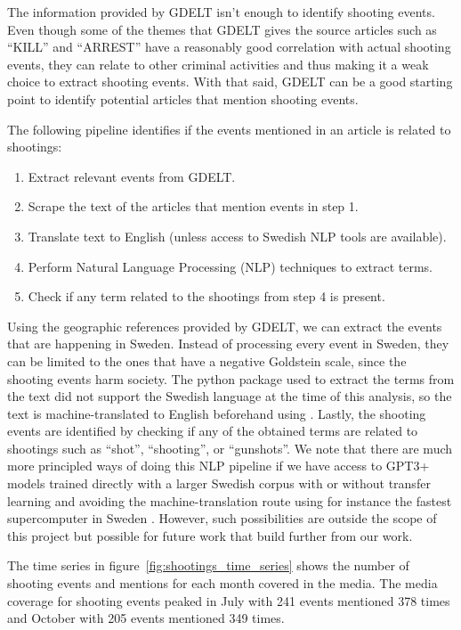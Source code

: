 \documentclass[a4, 11pt]{article}
\begin{document}
 The information provided by GDELT isn't enough to identify shooting
 events. Even though some of the themes that GDELT gives the source articles such as ``KILL''
 and ``ARREST'' have a reasonably good correlation with actual shooting events, they can relate
 to other criminal activities and thus making it a weak choice to extract shooting events. 
 With that said, GDELT can be a good starting point to identify potential articles 
 that mention shooting events.

 The following pipeline identifies if the events mentioned in an article is
 related to shootings:

 \begin{enumerate}
     \item Extract relevant events from GDELT.
     \item Scrape the text of the articles that mention events in step 1.
     \item Translate text to English (unless access to Swedish NLP tools are available). %
     \item Perform Natural Language Processing (NLP) techniques to extract terms.
     \item Check if any term related to the shootings from step 4 is present.
 \end{enumerate}

 Using the geographic references provided by GDELT, we can extract the events
 that are happening in Sweden. Instead of processing every event in Sweden, they
 can be limited to the ones that have a negative Goldstein scale, since the
 shooting events harm society. The python package \cite{spacy}
 used to extract the terms from the text did not support the Swedish language at the time of this analysis, so the
 text is machine-translated to English beforehand using \cite{deep-translator}.
 Lastly, the shooting events are
 identified by checking if any of the obtained terms are related to shootings
 such as ``shot'', ``shooting'', or ``gunshots''. We note that there are much more principled ways of doing this NLP pipeline if we have access to GPT3+ models \cite{GPT3} trained directly with a larger Swedish corpus with or without transfer learning and avoiding the machine-translation route using for instance the fastest supercomputer in Sweden \cite{berzelius}. However, such possibilities are outside the scope of this project but possible for future work that build further from our work.

 The time series in figure~\ref{fig:shootings_time_series} shows the number of
 shooting events and mentions for each month covered in the media. The media
 coverage for shooting events peaked in July with 241 events mentioned 378 times
 and October with 205 events mentioned 349 times.
\end{document}
